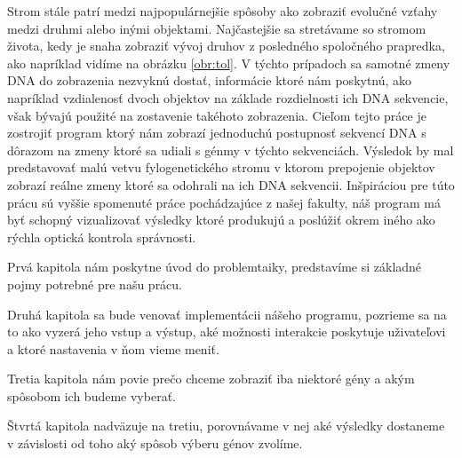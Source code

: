 Strom stále patrí medzi najpopulárnejšie spôsoby ako zobraziť evolučné vzťahy medzi druhmi alebo inými objektami.
Najčastejšie sa stretávame so stromom života, kedy je snaha zobraziť vývoj druhov z posledného spoločného prapredka, ako napríklad vidíme na obrázku \ref{obr:tol}.
V týchto prípadoch sa samotné zmeny DNA do zobrazenia nezvyknú dostať, informácie ktoré nám poskytnú, 
ako napríklad vzdialenosť dvoch objektov na základe rozdielnosti ich DNA sekvencie, však bývajú použité na zostavenie takéhoto zobrazenia.
Cieľom tejto práce je zostrojiť program ktorý nám zobrazí jednoduchú postupnosť sekvencí DNA s dôrazom na zmeny ktoré sa udiali s génmy v týchto sekvenciách.
Výsledok by mal predstavovať malú vetvu fylogenetického stromu v ktorom prepojenie objektov zobrazí reálne zmeny ktoré sa odohrali na ich DNA sekvencii.
Inšpiráciou pre túto prácu sú vyššie spomenuté práce pochádzajúce z našej fakulty,
náš program má byť schopný vizualizovať výsledky ktoré produkujú a poslúžiť okrem iného ako rýchla optická kontrola správnosti.

Prvá kapitola nám poskytne úvod do problemtaiky, predstavíme si základné pojmy potrebné pre našu prácu.

Druhá kapitola sa bude venovať implementácii nášeho programu, pozrieme sa na to ako vyzerá jeho vstup a výstup,
aké možnosti interakcie poskytuje uživateľovi a ktoré nastavenia v ňom vieme meniť.

Tretia kapitola nám povie prečo chceme zobraziť iba niektoré gény a akým spôsobom ich budeme vyberať.

Štvrtá kapitola nadväzuje na tretiu, porovnávame v nej aké výsledky dostaneme v závislosti od toho aký spôsob výberu génov zvolíme.
